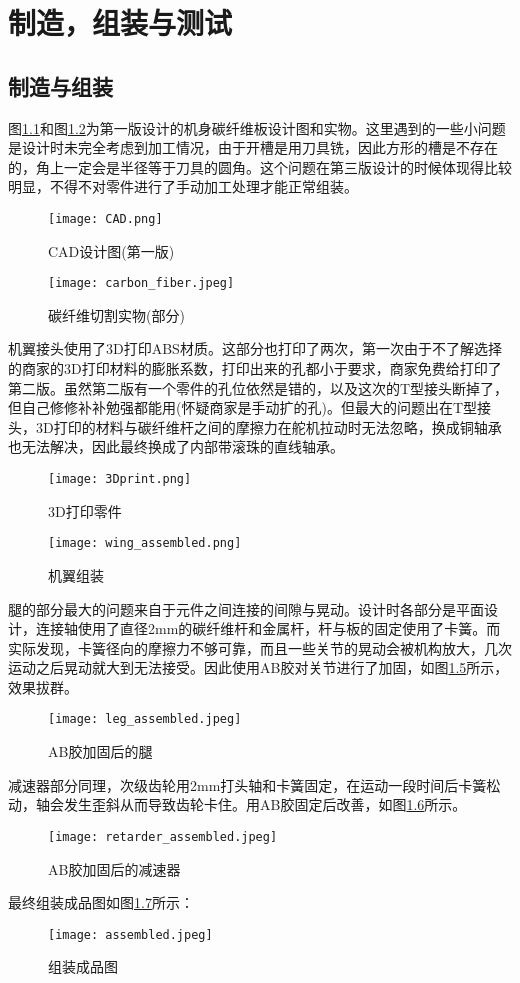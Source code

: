 
\chapter{制造，组装与测试}
\label{cha:chapter03}
\section{制造与组装}
图\ref{fig:CAD}和图\ref{fig:carbon_fiber}为第一版设计的机身碳纤维板设计图和实物。这里遇到的一些小问题是设计时未完全考虑到加工情况，由于开槽是用刀具铣，因此方形的槽是不存在的，角上一定会是半径等于刀具的圆角。这个问题在第三版设计的时候体现得比较明显，不得不对零件进行了手动加工处理才能正常组装。
\begin{figure}[H]
  \centering%
  \texttt{[image: CAD.png]}
  \caption{CAD设计图(第一版)}
  \label{fig:CAD}
\end{figure}
\begin{figure}[H]
  \centering%
  \texttt{[image: carbon\_fiber.jpeg]}
  \caption{碳纤维切割实物(部分)}
  \label{fig:carbon_fiber}
\end{figure}
机翼接头使用了3D打印ABS材质。这部分也打印了两次，第一次由于不了解选择的商家的3D打印材料的膨胀系数，打印出来的孔都小于要求，商家免费给打印了第二版。虽然第二版有一个零件的孔位依然是错的，以及这次的T型接头断掉了，但自己修修补补勉强都能用(怀疑商家是手动扩的孔)。但最大的问题出在T型接头，3D打印的材料与碳纤维杆之间的摩擦力在舵机拉动时无法忽略，换成铜轴承也无法解决，因此最终换成了内部带滚珠的直线轴承。
\begin{figure}[H]
  \centering%
  \texttt{[image: 3Dprint.png]}
  \caption{3D打印零件}
  \label{fig:3Dprint}
\end{figure}
\begin{figure}[H]
  \centering%
  \texttt{[image: wing\_assembled.png]}
  \caption{机翼组装}
  \label{fig:wing_assembled}
\end{figure}
腿的部分最大的问题来自于元件之间连接的间隙与晃动。设计时各部分是平面设计，连接轴使用了直径2mm的碳纤维杆和金属杆，杆与板的固定使用了卡簧。而实际发现，卡簧径向的摩擦力不够可靠，而且一些关节的晃动会被机构放大，几次运动之后晃动就大到无法接受。因此使用AB胶对关节进行了加固，如图\ref{fig:leg_assembled}所示，效果拔群。
\begin{figure}[H]
  \centering%
  \texttt{[image: leg\_assembled.jpeg]}
  \caption{AB胶加固后的腿}
  \label{fig:leg_assembled}
\end{figure}
减速器部分同理，次级齿轮用2mm打头轴和卡簧固定，在运动一段时间后卡簧松动，轴会发生歪斜从而导致齿轮卡住。用AB胶固定后改善，如图\ref{fig:retarder_assembled}所示。
\begin{figure}[H]
  \centering%
  \texttt{[image: retarder\_assembled.jpeg]}
  \caption{AB胶加固后的减速器}
  \label{fig:retarder_assembled}
\end{figure}
最终组装成品图如图\ref{fig:assembled}所示：
\begin{figure}[H]
  \centering%
  \texttt{[image: assembled.jpeg]}
  \caption{组装成品图}
  \label{fig:assembled}
\end{figure}
